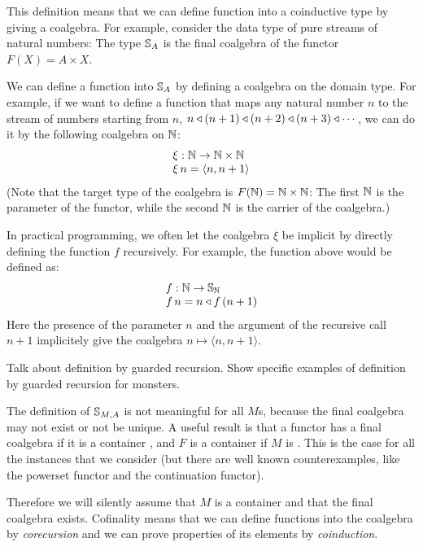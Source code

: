 \documentclass{article}
\begin{document}
This definition means that we can define function into a coinductive type by giving a coalgebra.
For example, consider the data type of pure streams of natural numbers:
The type $\mathbb{S}_{A}$ is the final coalgebra of the functor $F(X) = A\times X$.

We can define a function into $\mathbb{S}_{A}$ by defining a coalgebra on the domain type.
For example, if we want to define a function that maps any natural number $n$ to the stream of numbers starting from $n$, $n\triangleleft (n+1) \triangleleft (n+2) \triangleleft (n+3) \triangleleft \cdots$, we can do it by the following coalgebra on $\mathbb{N}$:
$$
\begin{array}{l}
\xi : \mathbb{N} \rightarrow \mathbb{N}\times \mathbb{N}\\
\xi\,n = \langle n,n+1\rangle
\end{array}
$$
(Note that the target type of the coalgebra is $F(\mathbb{N}) = \mathbb{N}\times\mathbb{N}$: The first $\mathbb{N}$ is the parameter of the functor, while the second $\mathbb{N}$ is the carrier of the coalgebra.)

In practical programming, we often let the coalgebra $\xi$ be implicit by directly defining the function $f$ recursively.
For example, the function above would be defined as:
$$
\begin{array}{l}
f: \mathbb{N} \rightarrow \mathbb{S}_{\mathbb{N}}\\
f\,n = n \triangleleft f\,(n+1)
\end{array}
$$
Here the presence of the parameter $n$ and the argument of the recursive call $n+1$ implicitely give the coalgebra $n \mapsto \langle n, n+1\rangle$.

\begin{vcomment}
Talk about definition by guarded recursion.
Show specific examples of definition by guarded recursion for monsters.
\end{vcomment}




The definition of $\mathbb{S}_{M,A}$ is not meaningful for all $M$s, because the final coalgebra may not exist or not be unique.
A useful result is that a functor has a final coalgebra if it is a container \cite{AAG:2005}, and $F$ is a container if $M$ is \cite{capretta/fowler:2017}.
This is the case for all the instances that we consider (but there are well known counterexamples, like the powerset functor and the continuation functor).

Therefore we will silently assume that $M$ is a container and that the final coalgebra exists.
Cofinality means that we can define functions into the coalgebra by {\em corecursion} and we can prove properties of its elements by {\em coinduction}.
\end{document}
